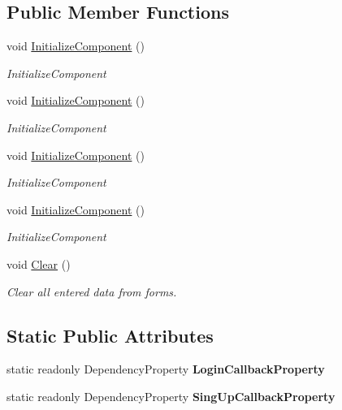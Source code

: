 \subsection*{Public Member Functions}
\begin{DoxyCompactItemize}
\item 
void \mbox{\hyperlink{class_wpf_handler_1_1_u_i_1_1_controls_1_1_logon_1_1_logon_panel_a96ecdfdcd36c8ff1f9dcf3ab85e4b461}{Initialize\+Component}} ()
\begin{DoxyCompactList}\small\item\em Initialize\+Component \end{DoxyCompactList}\item 
void \mbox{\hyperlink{class_wpf_handler_1_1_u_i_1_1_controls_1_1_logon_1_1_logon_panel_a96ecdfdcd36c8ff1f9dcf3ab85e4b461}{Initialize\+Component}} ()
\begin{DoxyCompactList}\small\item\em Initialize\+Component \end{DoxyCompactList}\item 
void \mbox{\hyperlink{class_wpf_handler_1_1_u_i_1_1_controls_1_1_logon_1_1_logon_panel_a96ecdfdcd36c8ff1f9dcf3ab85e4b461}{Initialize\+Component}} ()
\begin{DoxyCompactList}\small\item\em Initialize\+Component \end{DoxyCompactList}\item 
void \mbox{\hyperlink{class_wpf_handler_1_1_u_i_1_1_controls_1_1_logon_1_1_logon_panel_a96ecdfdcd36c8ff1f9dcf3ab85e4b461}{Initialize\+Component}} ()
\begin{DoxyCompactList}\small\item\em Initialize\+Component \end{DoxyCompactList}\item 
void \mbox{\hyperlink{class_wpf_handler_1_1_u_i_1_1_controls_1_1_logon_1_1_logon_panel_a1307c96701838404199db630a3cc2ae6}{Clear}} ()
\begin{DoxyCompactList}\small\item\em Clear all entered data from forms. \end{DoxyCompactList}\end{DoxyCompactItemize}
\subsection*{Static Public Attributes}
\begin{DoxyCompactItemize}
\item 
static readonly Dependency\+Property {\bfseries Login\+Callback\+Property}
\item 
static readonly Dependency\+Property {\bfseries Sing\+Up\+Callback\+Property}
\end{DoxyCompactItemize}
